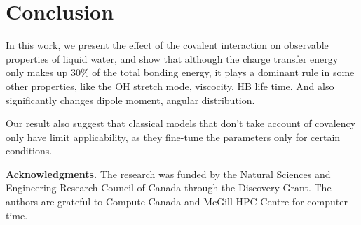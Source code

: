 \documentclass[prl,twocolumn,showpacs]{revtex4}
\begin{document}
\section{Conclusion}
 In this work, we present the effect of the covalent interaction on observable properties of liquid water, and show that although the charge transfer energy only makes up 30\% of the total bonding energy, it plays a dominant rule in some other properties, like the OH stretch mode, viscocity, HB life time. And also significantly changes dipole moment, angular distribution. 
 
 Our result also suggest that classical models that don't take account of covalency only have limit applicability, as they fine-tune the parameters only for certain conditions.
 
 
\textbf{Acknowledgments.} The research was funded by the Natural Sciences and Engineering Research Council of Canada through the Discovery Grant. The authors are grateful to Compute Canada and McGill HPC Centre for computer time.

\end{document}
